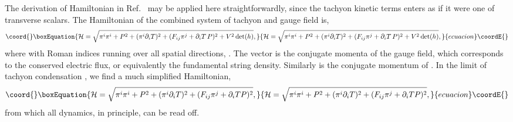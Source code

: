 \documentclass[a4paper,12pt]{article}
\providecommand{\p}{\partial}
\begin{document}
The derivation of Hamiltonian in Ref.~\cite{fluid} may be applied here
straightforwardly, since the tachyon kinetic terms enters as if it
were one of transverse scalars. The Hamiltonian of the combined
system of tachyon and gauge field is,
\begin{equation}\coord{}\boxEquation{
{\cal H}=\sqrt{ \pi^i\pi^i +P^2+(\pi^i\partial_i T)^2 + 
(F_{ij}\pi^j+\partial_i T\, P)^2 
+V^2\det(h)} ,
}{
{\cal H}=\sqrt{ \pi^i\pi^i +P^2+(\pi^i\partial_i T)^2 + 
(F_{ij}\pi^j+\partial_i T\, P)^2 
+V^2\det(h)} ,
}{ecuacion}\coordE{}\end{equation}
where \myHighlight{$h_{ij}\equiv \eta_{ij}+F_{ij} +\p_i T\p_j T $}\coordHE{}
with Roman indices \coordHE{} running over all spatial directions,
\coordHE{}.
The vector \coordHE{} is the conjugate momenta of the gauge field, which
corresponds to the conserved electric flux, or equivalently the
fundamental string density. Similarly \coordHE{} is the conjugate momentum of
\coordHE{}. In the limit of tachyon condensation \coordHE{}, we find a
much simplified Hamiltonian,
\begin{equation}\coord{}\boxEquation{
{\cal H}=\sqrt{ \pi^i\pi^i +P^2+ (\pi^i\partial_i T)^2 +(F_{ij}\pi^j+
\partial_i T P)^2 } ,
}{
{\cal H}=\sqrt{ \pi^i\pi^i +P^2+ (\pi^i\partial_i T)^2 +(F_{ij}\pi^j+
\partial_i T P)^2 } ,
}{ecuacion}\coordE{}\end{equation}
from which all dynamics, in principle,  can be read off.
\end{document}
